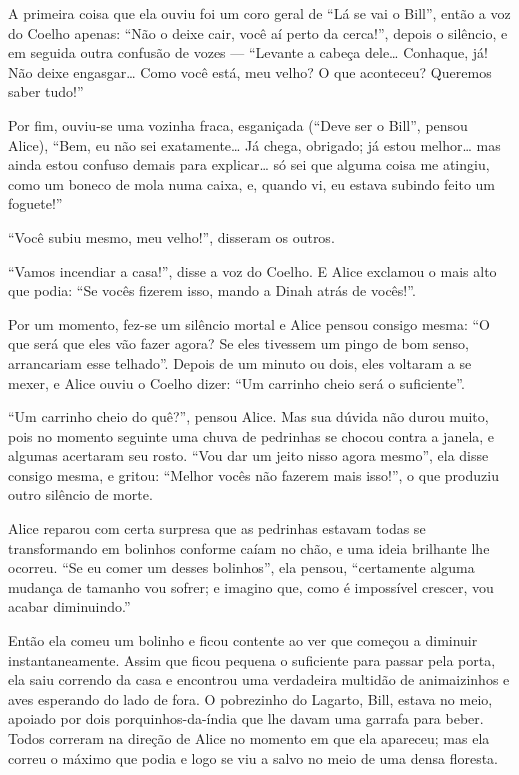 A primeira coisa que ela ouviu foi um coro geral de ``Lá se vai o
Bill'', então a voz do Coelho apenas: ``Não o deixe cair, você aí
perto da cerca!'', depois o silêncio, e em seguida outra confusão de
vozes --- ``Levante a cabeça dele\ldots{} Conhaque, já! Não deixe engasgar\ldots{}
Como você está, meu velho? O que aconteceu? Queremos saber tudo!''

Por fim, ouviu-se uma vozinha fraca, esganiçada (``Deve ser o Bill'',
pensou Alice), ``Bem, eu não sei exatamente\ldots{} Já chega, obrigado; já
estou melhor\ldots{} mas ainda estou confuso demais para explicar\ldots{} só sei
que alguma coisa me atingiu, como um boneco de mola numa caixa, e, quando
vi, eu estava subindo feito um foguete!''

``Você subiu mesmo, meu velho!'', disseram os outros.

``Vamos incendiar a casa!'', disse a voz do Coelho. E Alice exclamou o
mais alto que podia: ``Se vocês fizerem isso, mando a Dinah atrás de
vocês!''.

Por um momento, fez-se um silêncio mortal e Alice pensou consigo mesma:
``O que será que eles vão fazer agora? Se eles tivessem um pingo de bom
senso, arrancariam esse telhado''. Depois de um minuto ou dois, eles
voltaram a se mexer, e Alice ouviu o Coelho dizer: ``Um carrinho cheio
será o suficiente''.

``Um carrinho cheio do quê?'', pensou Alice. Mas sua dúvida não durou
muito, pois no momento seguinte uma chuva de pedrinhas se chocou contra
a janela, e algumas acertaram seu rosto. ``Vou dar um jeito nisso agora
mesmo'', ela disse consigo mesma, e gritou: ``Melhor vocês não fazerem
mais isso!'', o que produziu outro silêncio de morte.

Alice reparou com certa surpresa que as pedrinhas estavam todas se
transformando em bolinhos conforme caíam no chão, e uma ideia brilhante
lhe ocorreu. ``Se eu comer um desses bolinhos'', ela pensou,
``certamente alguma mudança de tamanho vou sofrer; e imagino que, como é
impossível crescer, vou acabar diminuindo.''

Então ela comeu um bolinho e ficou contente ao ver que começou a
diminuir instantaneamente. Assim que ficou pequena o suficiente para
passar pela porta, ela saiu correndo da casa e encontrou uma verdadeira
multidão de animaizinhos e aves esperando do lado de fora. O pobrezinho
do Lagarto, Bill, estava no meio, apoiado por dois porquinhos-da-índia
que lhe davam uma garrafa para beber. Todos correram na direção
de Alice no momento em que ela apareceu; mas ela correu o máximo que
podia e logo se viu a salvo no meio de uma densa floresta.

